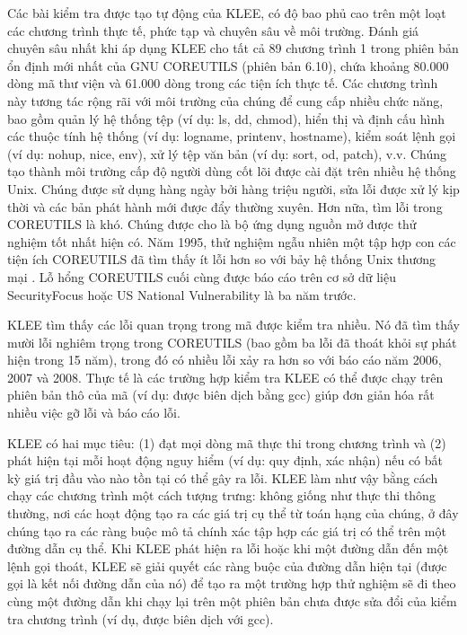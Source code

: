 \documentclass[12pt,a4paper]{report}
\begin{document}
\indent Các bài kiểm tra được tạo tự động của KLEE, có độ bao phủ cao trên một loạt các chương trình thực tế, phức tạp và chuyên sâu về môi trường. Đánh giá chuyên sâu nhất khi áp dụng KLEE cho tất cả 89 chương trình 1 trong phiên bản ổn định mới nhất của GNU COREUTILS (phiên bản 6.10), chứa khoảng 80.000 dòng mã thư viện và 61.000 dòng trong các tiện ích thực tế. Các chương trình này tương tác rộng rãi với môi trường của chúng để cung cấp nhiều chức năng, bao gồm quản lý hệ thống tệp (ví dụ: ls, dd, chmod), hiển thị và định cấu hình các thuộc tính hệ thống (ví dụ: logname, printenv, hostname), kiểm soát lệnh gọi (ví dụ: nohup, nice, env), xử lý tệp văn bản (ví dụ: sort, od, patch), v.v. Chúng tạo thành môi trường cấp độ người dùng cốt lõi được cài đặt trên nhiều hệ thống Unix. Chúng được sử dụng hàng ngày bởi hàng triệu người, sửa lỗi được xử lý kịp thời và các bản phát hành mới được đẩy thường xuyên. Hơn nữa, tìm lỗi trong COREUTILS là khó. Chúng được cho là bộ ứng dụng nguồn mở được thử nghiệm tốt nhất hiện có. Năm 1995, thử nghiệm ngẫu nhiên một tập hợp con các tiện ích COREUTILS đã tìm thấy ít lỗi hơn so với bảy hệ thống Unix thương mại \cite{miller2000re}. Lỗ hổng COREUTILS cuối cùng được báo cáo trên cơ sở dữ liệu SecurityFocus hoặc US National Vulnerability là ba năm trước.

\indent KLEE tìm thấy các lỗi quan trọng trong mã được kiểm tra nhiều. Nó đã tìm thấy mười lỗi nghiêm trọng trong COREUTILS (bao gồm ba lỗi đã thoát khỏi sự phát hiện trong 15 năm), trong đó có nhiều lỗi xảy ra hơn so với báo cáo năm 2006, 2007 và 2008. Thực tế là các trường hợp kiểm tra KLEE có thể được chạy trên phiên bản thô của mã (ví dụ: được biên dịch bằng gcc) giúp đơn giản hóa rất nhiều việc gỡ lỗi và báo cáo lỗi.

\indent KLEE có hai mục tiêu: (1) đạt mọi dòng mã thực thi trong chương trình và (2) phát hiện tại mỗi hoạt động nguy hiểm (ví dụ: quy định, xác nhận) nếu có bất kỳ giá trị đầu vào nào tồn tại có thể gây ra lỗi. KLEE làm như vậy bằng cách chạy các chương trình một cách tượng trưng: không giống như thực thi thông thường, nơi các hoạt động tạo ra các giá trị cụ thể từ toán hạng của chúng, ở đây chúng tạo ra các ràng buộc mô tả chính xác tập hợp các giá trị có thể trên một đường dẫn cụ thể. Khi KLEE phát hiện ra lỗi hoặc khi một đường dẫn đến một lệnh gọi thoát, KLEE sẽ giải quyết các ràng buộc của đường dẫn hiện tại (được gọi là kết nối đường dẫn của nó) để tạo ra một trường hợp thử nghiệm sẽ đi theo cùng một đường dẫn khi chạy lại trên một phiên bản chưa được sửa đổi của kiểm tra chương trình (ví dụ, được biên dịch với gcc).
\end{document}
